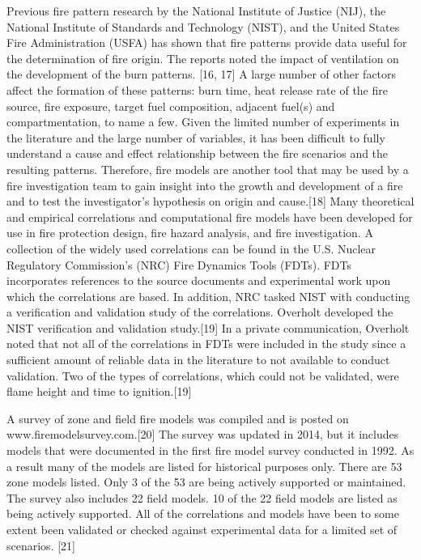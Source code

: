 \documentclass[twoside]{uocthesis}
\begin{document}
Previous fire pattern research by the National Institute of Justice (NIJ), the National Institute of Standards and Technology (NIST), and the United States Fire Administration (USFA) has shown that fire patterns provide data useful for the determination of fire origin.  The reports noted the impact of ventilation on the development of the burn patterns. [16, 17] A large number of other factors affect the formation of these patterns: burn time, heat release rate of the fire source, fire exposure, target fuel composition, adjacent fuel(s) and compartmentation, to name a few.    Given the limited number of experiments in the literature and the large number of variables, it has been difficult to fully understand a cause and effect relationship between the fire scenarios and the resulting patterns.  Therefore, fire models are another tool that may be used by a fire investigation team to gain insight into the growth and development of a fire and to test the investigator’s hypothesis on origin and cause.[18]  Many theoretical and empirical correlations and computational fire models have been developed for use in fire protection design, fire hazard analysis, and fire investigation.  A collection of the widely used correlations can be found in the U.S. Nuclear Regulatory Commission’s (NRC) Fire Dynamics Tools (FDTs).  FDTs incorporates references to the source documents and experimental work upon which the correlations are based. In addition, NRC tasked NIST with conducting a verification and validation study of the correlations. Overholt developed the NIST verification and validation study.[19] In a private communication, Overholt noted that not all of the correlations in FDTs were included in the study since a sufficient amount of reliable data in the literature to not available to conduct validation.  Two of the types of correlations, which could not be validated, were flame height and time to ignition.[19]

A survey of zone and field fire models was compiled and is posted on www.firemodelsurvey.com.[20] The survey was updated in 2014, but it includes models that were documented in the first fire model survey conducted in 1992. As a result many of the models are listed for historical purposes only.  There are 53 zone models listed. Only 3 of the 53 are being actively supported or maintained.  The survey also includes 22 field models.  10 of the 22 field models are listed as being actively supported.  All of the correlations and models have been to some extent been validated or checked against experimental data for a limited set of scenarios. [21] 
\end{document}
